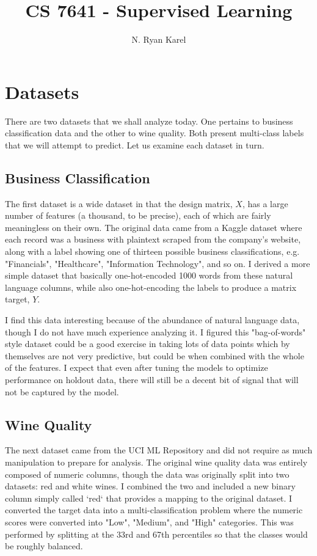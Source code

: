 \documentclass[
	letterpaper, %
]{jdf}
\author{N. Ryan Karel}
\title{CS 7641 - Supervised Learning}
\begin{document}

\maketitle

\section{Datasets}
There are two datasets that we shall analyze today. One pertains to business classification data and the other to wine quality. Both present multi-class labels that we will attempt to predict. Let us examine each dataset in turn.

\subsection{Business Classification}
The first dataset is a wide dataset in that the design matrix, $X$, has a large number of features (a thousand, to be precise), each of which are fairly meaningless on their own. The original data came from a Kaggle dataset where each record was a business with plaintext scraped from the company's website, along with a label showing one of thirteen possible business classifications, e.g. "Financials", "Healthcare", "Information Technology", and so on. I derived a more simple dataset that basically one-hot-encoded 1000 words from these natural language columns, while also one-hot-encoding the labels to produce a matrix target, $Y$. 

I find this data interesting because of the abundance of natural language data, though I do not have much experience analyzing it. I figured this "bag-of-words" style dataset could be a good exercise in taking lots of data points which by themselves are not very predictive, but could be when combined with the whole of the features. I expect that even after tuning the models to optimize performance on holdout data, there will still be a decent bit of signal that will not be captured by the model.

\subsection{Wine Quality}
The next dataset came from the UCI ML Repository and did not require as much manipulation to prepare for analysis. The original wine quality data was entirely composed of numeric columns, though the data was originally split into two datasets: red and white wines. I combined the two and included a new binary column simply called `red` that provides a mapping to the original dataset. I converted the target data into a multi-classification problem where the numeric scores were converted into "Low", "Medium", and "High" categories. This was performed by splitting at the 33rd and 67th percentiles so that the classes would be roughly balanced.
\end{document}

